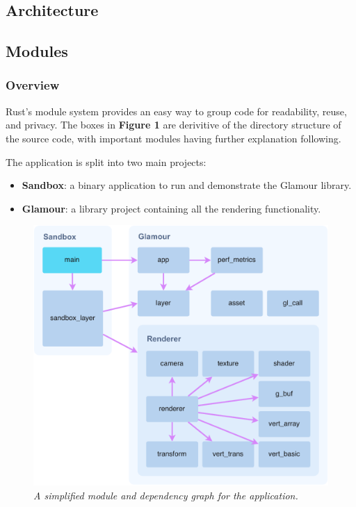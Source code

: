 \begin{multicols}{2}
  \section{Architecture}

  \subsection{Modules}

  \subsubsection{Overview}
  Rust's module system provides an easy way to group code for readability, reuse, and privacy.
  The boxes in \textbf{Figure 1} are derivitive of the directory structure of the source code, with important modules having further explanation following.

  The application is split into two main projects:
  \begin{itemize}
    \item \textbf{Sandbox}: a binary application to run and demonstrate the Glamour library.
    \item \textbf{Glamour}: a library project containing all the rendering functionality.
  \end{itemize}

  \begin{figure}[H]
    \includegraphics[width=1\columnwidth]{../module-graph.pdf}
    \caption[Module graph]{\emph{A simplified module and dependency graph for the application.}}\label{fig:module-graph}
  \end{figure}


\end{multicols}
